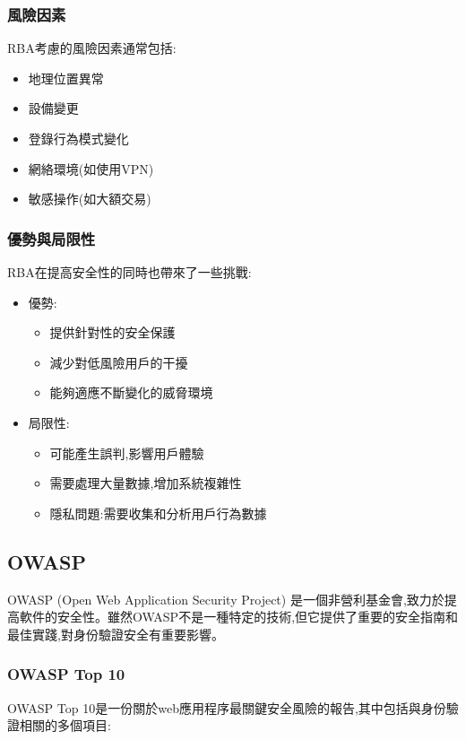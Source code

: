 \subsubsection{風險因素}
RBA考慮的風險因素通常包括:
\begin{itemize}
  \item 地理位置異常
  \item 設備變更
  \item 登錄行為模式變化
  \item 網絡環境(如使用VPN)
  \item 敏感操作(如大額交易)
\end{itemize}

\subsubsection{優勢與局限性}
RBA在提高安全性的同時也帶來了一些挑戰:
\begin{itemize}
  \item 優勢:
        \begin{itemize}
          \item 提供針對性的安全保護
          \item 減少對低風險用戶的干擾
          \item 能夠適應不斷變化的威脅環境
        \end{itemize}
  \item 局限性:
        \begin{itemize}
          \item 可能產生誤判,影響用戶體驗
          \item 需要處理大量數據,增加系統複雜性
          \item 隱私問題:需要收集和分析用戶行為數據
        \end{itemize}
\end{itemize}

\subsection{OWASP}
OWASP (Open Web Application Security Project) 是一個非營利基金會,致力於提高軟件的安全性。雖然OWASP不是一種特定的技術,但它提供了重要的安全指南和最佳實踐,對身份驗證安全有重要影響。

\subsubsection{OWASP Top 10}
OWASP Top 10是一份關於web應用程序最關鍵安全風險的報告,其中包括與身份驗證相關的多個項目:


